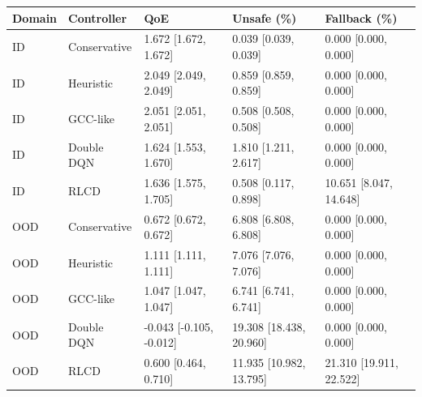 \begin{tabular}{lllll}
\toprule
Domain & Controller & QoE & Unsafe (\%) & Fallback (\%) \\
\midrule
ID & Conservative & 1.672 [1.672, 1.672] & 0.039 [0.039, 0.039] & 0.000 [0.000, 0.000] \\
ID & Heuristic & 2.049 [2.049, 2.049] & 0.859 [0.859, 0.859] & 0.000 [0.000, 0.000] \\
ID & GCC-like & 2.051 [2.051, 2.051] & 0.508 [0.508, 0.508] & 0.000 [0.000, 0.000] \\
ID & Double DQN & 1.624 [1.553, 1.670] & 1.810 [1.211, 2.617] & 0.000 [0.000, 0.000] \\
ID & RLCD & 1.636 [1.575, 1.705] & 0.508 [0.117, 0.898] & 10.651 [8.047, 14.648] \\
OOD & Conservative & 0.672 [0.672, 0.672] & 6.808 [6.808, 6.808] & 0.000 [0.000, 0.000] \\
OOD & Heuristic & 1.111 [1.111, 1.111] & 7.076 [7.076, 7.076] & 0.000 [0.000, 0.000] \\
OOD & GCC-like & 1.047 [1.047, 1.047] & 6.741 [6.741, 6.741] & 0.000 [0.000, 0.000] \\
OOD & Double DQN & -0.043 [-0.105, -0.012] & 19.308 [18.438, 20.960] & 0.000 [0.000, 0.000] \\
OOD & RLCD & 0.600 [0.464, 0.710] & 11.935 [10.982, 13.795] & 21.310 [19.911, 22.522] \\
\bottomrule
\end{tabular}
